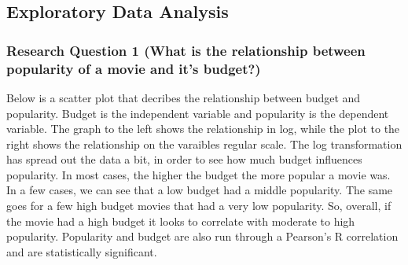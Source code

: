 \documentclass[11pt]{article}
\begin{document}
    \subsection{Exploratory Data Analysis}\label{exploratory-data-analysis}

\subsubsection{Research Question 1 (What is the relationship between
popularity of a movie and it's
budget?)}\label{research-question-1-what-is-the-relationship-between-popularity-of-a-movie-and-its-budget}

    Below is a scatter plot that decribes the relationship between budget
and popularity. Budget is the independent variable and popularity is the
dependent variable. The graph to the left shows the relationship in log,
while the plot to the right shows the relationship on the varaibles
regular scale. The log transformation has spread out the data a bit, in
order to see how much budget influences popularity. In most cases, the
higher the budget the more popular a movie was. In a few cases, we can
see that a low budget had a middle popularity. The same goes for a few
high budget movies that had a very low popularity. So, overall, if the
movie had a high budget it looks to correlate with moderate to high
popularity. Popularity and budget are also run through a Pearson's R
correlation and are statistically significant.
\end{document}
